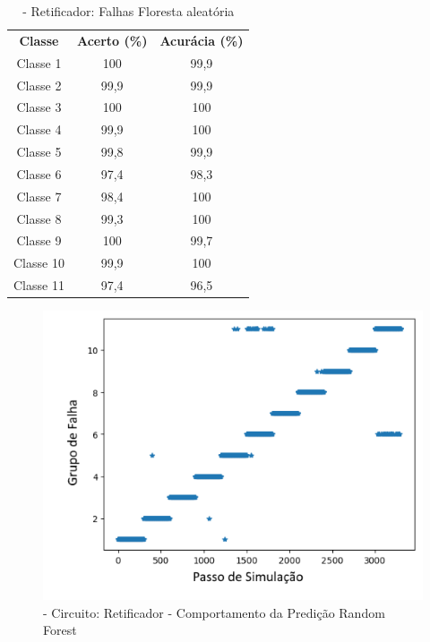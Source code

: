 \begin{itemize}
 \begin{table}[ht]
\centering
\begin{tabular}{ccc}
\textbf{Classe} & \textbf{Acerto (\%)} & \textbf{Acurácia (\%)} \\
Classe 1        & 100                  & 99,9                    \\
Classe 2        & 99,9                  & 99,9                    \\
Classe 3        & 100                  & 100                    \\
Classe 4        & 99,9                  & 100                    \\
Classe 5        & 99,8                  & 99,9                    \\
Classe 6        & 97,4                  & 98,3                    \\
Classe 7        & 98,4                  & 100                    \\
Classe 8        & 99,3                  & 100                    \\
Classe 9        & 100                  & 99,7                    \\
Classe 10       & 99,9                  & 100                    \\
Classe 11       & 97,4                  & 96,5                                  
\end{tabular}
\caption{\label{tab:Retnrandom}- Retificador: Falhas Floresta aleatória}
\end{table}


  \begin{figure}[H]
        \begin{center}
        \includegraphics[width=13cm]{./01_Pre_textuais/nonlin_figs/RandomForestClassifier_Nonlinear_Rectfier_+_4bit_PRBS_[FALHA]_-_300_-_02sraw.png}
        \caption{\label{fig:randomforestClassifieRet}- Circuito: Retificador - Comportamento da Predição Random Forest }
        \end{center}
        \end{figure}


\end{itemize}
